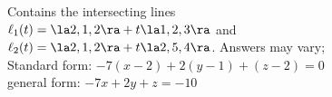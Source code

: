 {Contains the intersecting lines\\
$\ell_1(t) = \la 2,1,2\ra + t\la 1,2,3\ra$ and \\
$\ell_2(t) = \la 2,1,2\ra + t\la 2,5,4\ra$.
}
{Answers may vary;\\
Standard form: $-7(x-2)+2(y-1)+(z-2)=0$\\
general form: $-7x+2y+z=-10$
}

